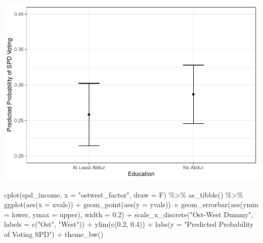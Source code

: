 \documentclass[
]{article}
\newenvironment{Shaded}{\begin{snugshade}}{\end{snugshade}}
\newcommand{\AttributeTok}[1]{\textcolor[rgb]{0.77,0.63,0.00}{#1}}
\newcommand{\FloatTok}[1]{\textcolor[rgb]{0.00,0.00,0.81}{#1}}
\newcommand{\FunctionTok}[1]{\textcolor[rgb]{0.00,0.00,0.00}{#1}}
\newcommand{\NormalTok}[1]{#1}
\newcommand{\SpecialCharTok}[1]{\textcolor[rgb]{0.00,0.00,0.00}{#1}}
\newcommand{\StringTok}[1]{\textcolor[rgb]{0.31,0.60,0.02}{#1}}
\begin{document}
\includegraphics{AVCD_Final_Assignment-Edenhofer_files/figure-latex/spd-education-1.pdf}

\begin{Shaded}
\begin{Highlighting}[]
\FunctionTok{cplot}\NormalTok{(spd\_income, }\AttributeTok{x =} \StringTok{"ostwest\_factor"}\NormalTok{, }\AttributeTok{draw =}\NormalTok{ F) }\SpecialCharTok{\%\textgreater{}\%}
  \FunctionTok{as\_tibble}\NormalTok{() }\SpecialCharTok{\%\textgreater{}\%}
  \FunctionTok{ggplot}\NormalTok{(}\FunctionTok{aes}\NormalTok{(}\AttributeTok{x =}\NormalTok{ xvals)) }\SpecialCharTok{+}
  \FunctionTok{geom\_point}\NormalTok{(}\FunctionTok{aes}\NormalTok{(}\AttributeTok{y =}\NormalTok{ yvals)) }\SpecialCharTok{+}
  \FunctionTok{geom\_errorbar}\NormalTok{(}\FunctionTok{aes}\NormalTok{(}\AttributeTok{ymin =}\NormalTok{ lower, }\AttributeTok{ymax =}\NormalTok{ upper), }\AttributeTok{width =} \FloatTok{0.2}\NormalTok{) }\SpecialCharTok{+}
  \FunctionTok{scale\_x\_discrete}\NormalTok{(}\StringTok{"Ost{-}West Dummy"}\NormalTok{, }\AttributeTok{labels =} \FunctionTok{c}\NormalTok{(}\StringTok{"Ost"}\NormalTok{, }\StringTok{"West"}\NormalTok{)) }\SpecialCharTok{+}
  \FunctionTok{ylim}\NormalTok{(}\FunctionTok{c}\NormalTok{(}\FloatTok{0.2}\NormalTok{, }\FloatTok{0.4}\NormalTok{)) }\SpecialCharTok{+}
  \FunctionTok{labs}\NormalTok{(}\AttributeTok{y =} \StringTok{"Predicted Probability of Voting SPD"}\NormalTok{) }\SpecialCharTok{+}
  \FunctionTok{theme\_bw}\NormalTok{()}
\end{Highlighting}
\end{Shaded}
\end{document}
